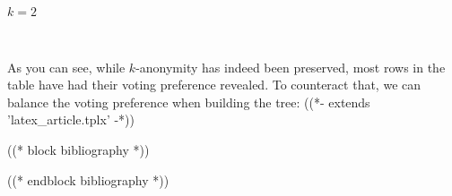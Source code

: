 \documentclass[11pt]{article}
\begin{document}
    $k = 2$

    
    \begin{center}
    \end{center}
    { \hspace*{\fill} \\}
    
    
    
    As you can see, while \(k\)-anonymity has indeed been preserved, most
rows in the table have had their voting preference revealed. To
counteract that, we can balance the voting preference when building the
tree:
((*- extends 'latex_article.tplx' -*))

((* block bibliography *))


((* endblock bibliography *))

    
    
    
    
\end{document}
